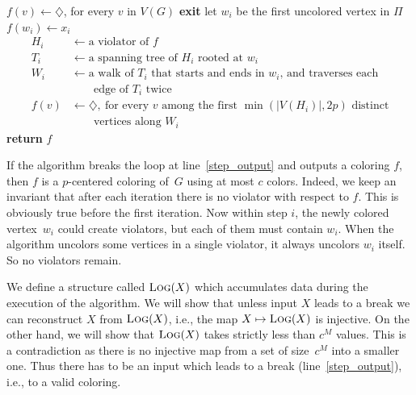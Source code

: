 \documentclass[11pt]{article}
\begin{document}
\begin{algorithm}
\caption{Input: $X=(x_1,\ldots,x_M)$ with $x_i\in\{1,\ldots,c\}$}
\label{algo-naive}
\begin{algorithmic}[1]
\State $f(v) \gets \diamondsuit$, for every $v$ in $V(G)$
\label{step_mainLoop}
  \label{step_breakingIf}
    \State\label{step_output} \textbf{exit}
  \EndIf
  \State\label{step_TakeUncoloredVertex} let $w_i$
                      be the first uncolored vertex in $\Pi$
  \State\label{step_assignColor} $f(w_i) \gets x_i$
  \label{step_mainIf}
  \begin{align*}
  H_i &\gets \textrm{a violator of $f$}\\
  T_i &\gets \textrm{a spanning tree of $H_i$ rooted at $w_i$}\\
  W_i &\gets \textrm{a walk of $T_i$ that starts and ends in $w_i$, and traverses each}\\
  &\qquad\textrm{edge of $T_i$ twice}\\
  f(v) &\gets\diamondsuit,\ \textrm{for every $v$ among the first $\min(|V(H_i)|,2p)$ distinct}\\
  &\qquad\textrm{vertices along $W_i$}
  \end{align*}
  \EndIf
\EndFor
\State \textbf{return} $f$
\end{algorithmic}
\end{algorithm}

If the algorithm breaks the loop at line~\ref{step_output} and outputs
a coloring $f$, then $f$ is a $p$-centered coloring of~$G$ using at
most $c$ colors. Indeed, we keep an invariant that after each
iteration there is no violator with respect to $f$.  This is obviously
true before the first iteration.  Now within step $i$, the newly
colored vertex~$w_i$ could create violators, but each of them must
contain $w_i$. When the algorithm uncolors some vertices in a single
violator, it always uncolors $w_i$ itself.
So no violators remain.

We define a structure called $\text{\scshape Log}(X)$ which accumulates data during the
execution of the algorithm.  We will show that unless input $X$ leads to a
break we can reconstruct $X$ from $\text{\scshape Log}(X)$, i.e., the map $X \mapsto \text{\scshape Log}(X)$
is injective. On the other hand, we will show that $\text{\scshape Log}(X)$ takes strictly
less than $c^M$ values.  This is a contradiction as there is no injective map
from a set of size~$c^M$ into a smaller one.  Thus there has to be an input
which leads to a break (line~\ref{step_output}), i.e., to a valid coloring.
\end{document}
